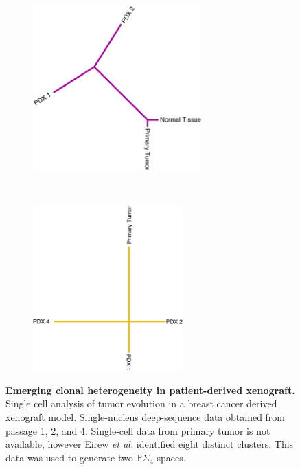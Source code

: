 \documentclass[a4paper,11pt]{article}
\begin{document}
\begin{figure}
    \begin{subfigure}{0.5\linewidth}
    \centering
    \includegraphics[height=2.5in]{../figures/xenograft_tree_purple.pdf}
    \end{subfigure}
    ~
    \begin{subfigure}{0.5\linewidth}
    \centering
    \includegraphics[height=2.5in]{../figures/xenograft_tree_gold.pdf}
    \end{subfigure}

    \caption{{\bf Emerging clonal heterogeneity in patient-derived xenograft.} Single cell analysis of tumor evolution in a breast cancer derived xenograft model. Single-nucleus deep-sequence data obtained from passage 1, 2, and 4. Single-cell data from primary tumor is not available, however Eirew \textit{et al.} identified eight distinct clusters. This data was used to generate two $\mathbb{P}\Sigma_4 $ spaces.}
    \label{fig:xenograft}
\end{figure} 
\end{document}
